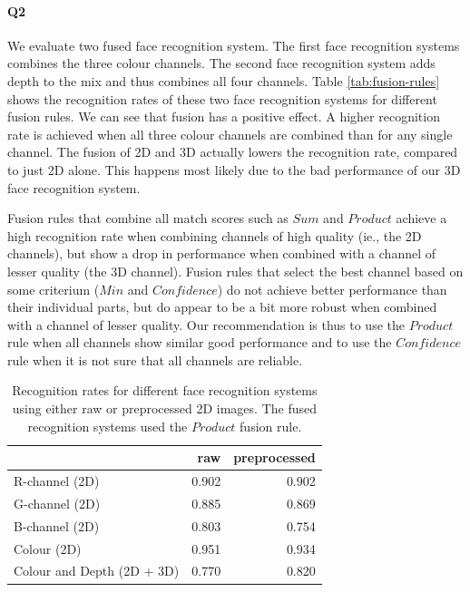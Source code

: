 \documentclass[]{article}
\begin{document}
\paragraph{Q2} We evaluate two fused face recognition system. The first face recognition systems combines the three colour channels. The second face recognition system adds depth to the mix and thus combines all four channels. Table \ref{tab:fusion-rules} shows the recognition rates of these two face recognition systems for different fusion rules. We can see that fusion has a positive effect. A higher recognition rate is achieved when all three colour channels are combined than for any single channel. The fusion of 2D and 3D actually lowers the recognition rate, compared to just 2D alone. This happens most likely due to the bad performance of our 3D face recognition system.

Fusion rules that combine all match scores such as $Sum$ and $Product$ achieve a high recognition rate when combining channels of high quality (ie., the 2D channels), but show a drop in performance when combined with a channel of lesser quality (the 3D channel). Fusion rules that select the best channel based on some criterium ($Min$ and $Confidence$) do not achieve better performance than their individual parts, but do appear to be a bit more robust when combined with a channel of lesser quality. Our recommendation is thus to use the $Product$ rule when all channels show similar good performance and to use the $Confidence$ rule when it is not sure that all channels are reliable.

\begin{table}
	\centering
	\begin{tabular}{lrr}
		\toprule
			& raw & preprocessed\\
		\midrule
		R-channel (2D) & 0.902& 0.902\\
		G-channel (2D) & 0.885& 0.869 \\
		B-channel (2D) & 0.803& 0.754  \\
		Colour (2D) & 0.951& 0.934\\
		Colour and Depth (2D + 3D) & 0.770 & 0.820\\
		\bottomrule
	\end{tabular}
	\caption{Recognition rates for different face recognition systems using either raw or preprocessed 2D images. The fused recognition systems used the $Product$ fusion rule.}
	\label{tab:preprocess-rr}
\end{table}
\end{document}
